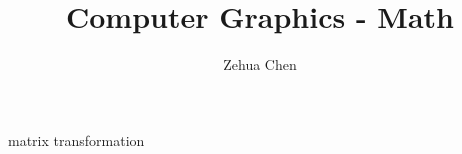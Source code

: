 \documentclass[letterpaper, 11pt]{report}
\title{Computer Graphics - Math}
\author{Zehua Chen}
\begin{document}
  \maketitle
  \tableofcontents

  {matrix}
  {transformation}
\end{document}
